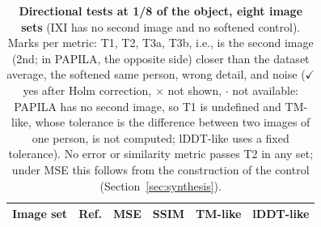\begin{table}[t]
\centering
\caption{\textbf{Directional tests at 1/8 of the object, eight image sets} (IXI has no second image and no softened control).
Marks per metric: T1, T2, T3a, T3b, i.e., is the second image (2nd; in PAPILA, the opposite side) closer than the dataset average, the softened same person, wrong detail, and noise ($\checkmark$ yes after Holm correction, $\times$ not shown, $\cdot$ not available: PAPILA has no second image, so T1 is undefined and \acs{TM}-like, whose tolerance is the difference between two images of one person, is not computed; \acs{lDDT}-like uses a fixed tolerance).
No error or similarity metric passes T2 in any set; under \acs{MSE} this follows from the construction of the control (Section~\ref{sec:synthesis}).}
\label{tab:tests}
\footnotesize
\setlength{\tabcolsep}{3pt}
\begin{tabular}{@{}llcccc@{}}
\toprule
Image set & Ref. & \acs{MSE} & \acs{SSIM} & \acs{TM}-like & \acs{lDDT}-like \\
\midrule
\end{tabular}
\end{table}
